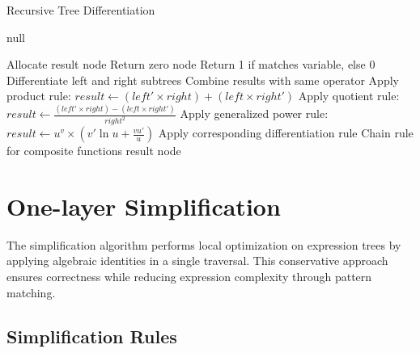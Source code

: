 \documentclass{report}
\begin{document}
\begin{algorithm}[H]
\caption{Recursive Tree Differentiation}
\begin{algorithmic}[1]
        \State \Return null
    \EndIf
    
    \State Allocate result node
        \State Return zero node
        \State Return 1 if matches variable, else 0
        \State Differentiate left and right subtrees
        \State Combine results with same operator
        \State Apply product rule:
        \State $result \gets (left' \times right) + (left \times right')$
        \State Apply quotient rule:
        \State $result \gets \frac{(left' \times right) - (left \times right')}{right^2}$
        \State Apply generalized power rule:
        \State $result \gets u^v \times (v'\ln u + \frac{vu'}{u})$
        \State Apply corresponding differentiation rule
        \State Chain rule for composite functions
    \EndIf
    \State \Return result node
\EndFunction
\end{algorithmic}
\end{algorithm}


\section{One-layer Simplification}

The simplification algorithm performs local optimization on expression trees by applying algebraic identities in a single traversal. This conservative approach ensures correctness while reducing expression complexity through pattern matching.

\subsection*{Simplification Rules}
\end{document}
